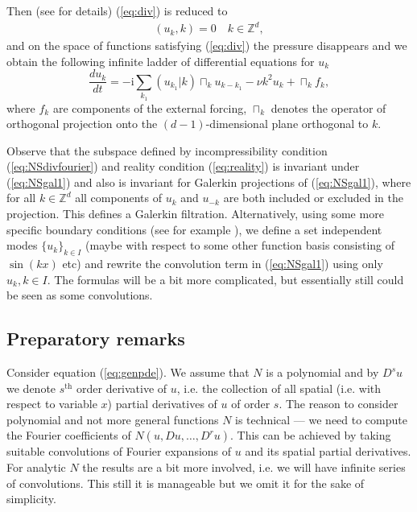 Then (see \cite{Z} for details) (\ref{eq:div}) is reduced to 
\begin{eqnarray}
    (u_k,k)=0 \quad k \in \mathbb{Z}^d,  \label{eq:NSdivfourier}
\end{eqnarray}
and on the space of functions satisfying (\ref{eq:div}) the pressure disappears and we obtain the following infinite ladder of differential equations
for $u_k$
\begin{equation}
  \frac{d u_k}{d t}=-\mathrm{i} \sum_{k_1}(u_{k_1}|k)\sqcap_k u_{k-k_1} - \nu k^2u_k + \sqcap_k f_k,
    \label{eq:NSgal1}
\end{equation}
where $f_k$ are components of the external forcing, $\sqcap_k$
denotes the operator of orthogonal projection onto the
$(d-1)$-dimensional plane orthogonal to $k$. 



Observe that the subspace defined by incompressibility condition (\ref{eq:NSdivfourier}) and reality condition (\ref{eq:reality})  is invariant under  (\ref{eq:NSgal1})
and also is invariant for  Galerkin projections of (\ref{eq:NSgal1}), where for all $k \in \mathbb{Z}^d$ all components of $u_k$ and $u_{-k}$ are both included or excluded
in the projection.  This  defines a Galerkin filtration. Alternatively, using some more specific boundary conditions  (see for example \cite{AK21,BB21}), we define a set independent modes $\{u_k\}_{k \in I}$  (maybe with respect to some other function basis consisting of $\sin(kx)$ etc)
and rewrite the convolution term in (\ref{eq:NSgal1}) using only $u_k, k \in I$.  The formulas will be a bit more complicated, but essentially still could be seen as some
convolutions.





\subsection{Preparatory remarks}
Consider equation (\ref{eq:genpde}). We assume that $N$ is a polynomial and by $D^s u$ we denote $s^{\text{th}}$ order derivative of $u$, i.e. the collection of all spatial (i.e. with respect to variable $x$) partial derivatives of $u$ of order $s$. The reason to consider polynomial and not more general functions $N$ is technical --- we need to compute the Fourier coefficients of $N\left(u,Du,\dots,D^ru\right)$. This can be achieved by taking suitable convolutions of Fourier expansions of $u$ and its spatial partial derivatives. For analytic $N$ the results are a bit more involved, i.e. we will have infinite series of convolutions. This still it is manageable but we omit it for the sake
of simplicity.


